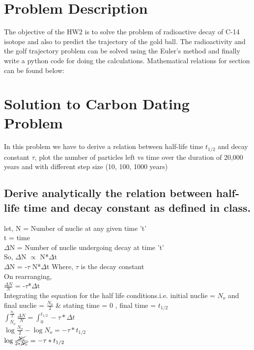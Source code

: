 \documentclass[11pt]{article}
\begin{document}
\section{Problem Description}
The objective of the HW2 is to solve the problem of radioactive decay of C-14 isotope and also to predict the trajectory of the gold ball. The radioactivity and the golf trajectory problem can be solved using the Euler's method and finally write a python code for doing the calculations.  Mathematical relations for section can be found below:

\section{Solution to Carbon Dating Problem}

In this problem we have to derive a relation between half-life time $t_{1/2}$ and decay constant $\tau$,  plot the number of particles left vs time over the duration of 20,000 years and with different step size (10, 100, 1000 years)

\subsection{Derive analytically the relation between half-life time  and decay constant as defined in class.}
let,
N = Number of nuclie at any given time 't'\\
t = time\\
$\Delta$N = Number of nuclie undergoing decay at time 't'\\
So, $\Delta$N $\propto $ N*$\Delta$t\\
$\Delta$N = -$\tau$ N*$\Delta$t {Where, $\tau$ is the decay constant}\\
On rearranging,\\
$\frac{\Delta N}{N}$ = -$\tau$*$\Delta$t\\
Integrating the equation for the half life conditions.i.e. initial nuclie = $N_{o}$ and final nuclie = $\frac{N_{o}}{2}$ \& stating time  = 0 , final time = $t_{1/2}$\\

$\int_{N_{o}}^{\frac{N_{o}}{2}}\frac{\Delta N}{N} = \int_{0}^{t_{1/2}}-\tau*\Delta t$\\

$\log\frac{N_{o}}{2} - \log N_{o} = -\tau*t_{1/2}$\\

$\log\frac{\cancel{N_{o}}}{2*\cancel{N_{o}}} = -\tau*t_{1/2}$\\
\end{document}
